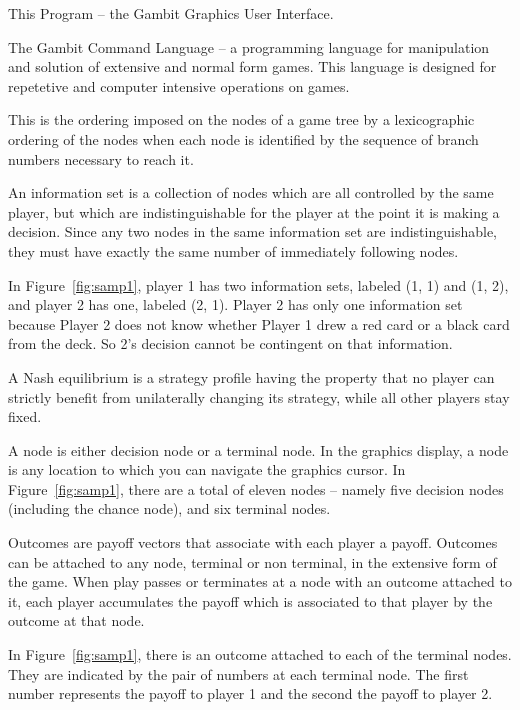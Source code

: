 \begin{helpglossary}
\label{guigloss}
This Program -- the Gambit Graphics User Interface.

\label{gclgloss}
The Gambit Command Language -- a programming language for manipulation and
solution of extensive and normal form games.  This language is designed
for repetetive and computer intensive operations on games.  

\label{indextravgloss}
This is the ordering imposed on the nodes of a game tree by a lexicographic 
ordering of the nodes when each node is identified by the sequence of branch 
numbers necessary to reach it.  

\label{infosetgloss}
An information set is a collection of nodes which are all controlled by
the same player, but which are indistinguishable 
for the player at the point it is making a decision.  Since any two nodes 
in the same information set are indistinguishable, they must have exactly 
the same number of immediately following nodes. 

In Figure~\ref{fig:samp1}, player 1 has two information
sets, labeled (1, 1) and (1, 2), and player 2 has one, labeled (2, 1).
Player 2 has only one information set because Player 2 does not know whether
 Player 1 drew a red card or a black card from the deck.  So 2's decision 
cannot be contingent on that information.

\label{nashequigloss}
A Nash equilibrium is a strategy profile having the property that no player 
can strictly benefit from unilaterally changing its strategy, while all 
other players stay fixed.  

\label{nodegloss}
A node is either decision node or a terminal node.  In the graphics 
display, a node is any location to which you can navigate the graphics 
cursor. In Figure~\ref{fig:samp1}, there are a total of eleven nodes -- namely 
five decision nodes (including the chance node), and six terminal nodes.  

\label{outcomegloss}
Outcomes are payoff vectors that associate with each player a payoff.  
Outcomes can be attached to any node, terminal or non terminal, in the 
extensive form of the game.  When play passes or terminates at a node 
with an outcome attached to it, each player accumulates the payoff which 
is associated to that player by the outcome at that node. 

In Figure~\ref{fig:samp1}, there is an outcome attached to each of the
terminal nodes.  They are indicated by the pair of numbers at each
terminal node.  The first number represents the payoff to player 1 and the
second the payoff to player 2.


\end{helpglossary}
